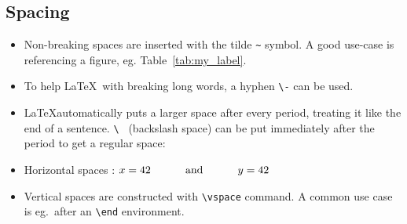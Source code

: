 \documentclass[a4paper]{article}
\newcommand{\sign}[1]{\texttt{\textbackslash{#1}}}
\begin{document}
\subsection{Spacing}

\begin{itemize}[leftmargin=*]
    \item Non-breaking spaces are inserted with the tilde \texttt{\~} symbol. A good use-case is referencing a figure, eg. Table~\ref{tab:my_label}.
    \item To help \LaTeX\ with breaking long words, a hyphen \sign{-} can be used.
    \item \LaTeX automatically puts a larger space after every period, treating it like the end of a sentence. \sign{ } (backslash space) can be put immediately after the period to get a regular space:


\item Horizontal spaces \underline{\hspace{2cm}}: \(x=42 \text{\hspace{1cm} and \hspace{1cm}} y=42\)

\item Vertical spaces are constructed with \sign{vspace} command. A common use case is eg.\ after an \sign{end} environment.


\end{itemize}
\end{document}

